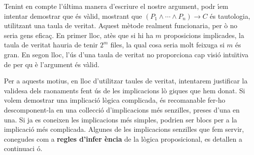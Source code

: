 \bigskip

Tenint en compte l'\'{u}ltima manera d'escriure el nostre argument, podr%
\'{\i}em intentar demostrar que \'{e}s v\`{a}lid, mostrant que $\left(
P_{1}\wedge\cdots\wedge P_{n}\right) \longrightarrow C$ \'{e}s tautologia,
utilitzant una taula de veritat. Aquest m\`{e}tode realment funcionaria, per%
\`{o} no seria gens efica\c{c}. En primer lloc, at\`{e}s que si hi ha $m$
proposicions implicades, la taula de veritat hauria de tenir $2^{m}$ files,
la qual cosa seria molt feixuga si $m$ \'{e}s gran. En segon lloc, l'\'{u}s
d'una taula de veritat no proporciona cap visi\'{o} intu\"{\i}tiva de per qu%
\`{e} l'argument \'{e}s v\`{a}lid.

Per a aquests motius, en lloc d'utilitzar taules de veritat, intentarem
justificar la validesa dels raonaments fent \'{u}s de les implicacions l\`{o}%
giques que hem donat. Si volem demostrar una implicaci\'{o} l\`{o}gica
complicada, \'{e}s recomanable fer-ho descomponent-la en una
col\textperiodcentered lecci\'{o} d'implicacions m\'{e}s senzilles, preses
d'una en una. Si ja es coneixen les implicacions m\'{e}s simples, podrien
ser blocs per a la implicaci\'{o} m\'{e}s complicada. Algunes de les
implicacions senzilles que fem servir, conegudes com a \textbf{regles d'infer%
\`{e}ncia} \label{sec:lleis-inferencia} de la l\`{o}gica proposicional, es detallen a continuaci%
\'{o}.

\bigskip

